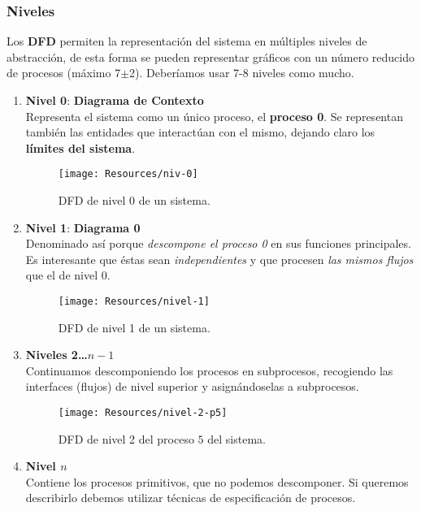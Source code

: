 \subsubsection{Niveles}
Los \textbf{DFD} permiten la representación del sistema en múltiples niveles de abstracción, de esta forma se pueden representar gráficos con un número reducido de procesos (máximo 7$\pm$2). Deberíamos usar 7-8 niveles como mucho.
\begin{enumerate}
    \item \textbf{Nivel 0}: \textbf{Diagrama de Contexto}\\
          Representa el sistema como un único proceso, el \textbf{proceso 0}. Se representan también las entidades que interactúan con el mismo, dejando claro los \textbf{límites del sistema}.

          \begin{figure}[h!]
              \centering
              \texttt{[image: Resources/niv-0]}
              \caption{DFD de nivel 0 de un sistema.}
              \label{fig:dfdn0}
          \end{figure}
    \item \textbf{Nivel 1}: \textbf{Diagrama 0}\\
          Denominado así porque \textit{descompone el proceso 0} en sus funciones principales. Es interesante que éstas sean \textit{independientes} y que procesen \textit{las mismos flujos} que el de nivel 0.
          \begin{figure}[h!]
              \centering
              \texttt{[image: Resources/nivel-1]}
              \caption{DFD de nivel 1 de un sistema.}
              \label{fig:dfdn1}
          \end{figure}
    \item \textbf{Niveles 2\ldots $n-1$}\\
          Continuamos descomponiendo los procesos en subprocesos, recogiendo las interfaces (flujos) de nivel superior y asignándoselas a subprocesos.
          \begin{figure}[h!]
              \centering
              \texttt{[image: Resources/nivel-2-p5]}
              \caption{DFD de nivel 2 del proceso $5$ del sistema.}
              \label{fig:dfdn2}
          \end{figure}
    \item \textbf{Nivel $n$}\\
          Contiene los procesos primitivos, que no podemos descomponer. Si queremos describirlo debemos utilizar técnicas de especificación de procesos.
\end{enumerate}


